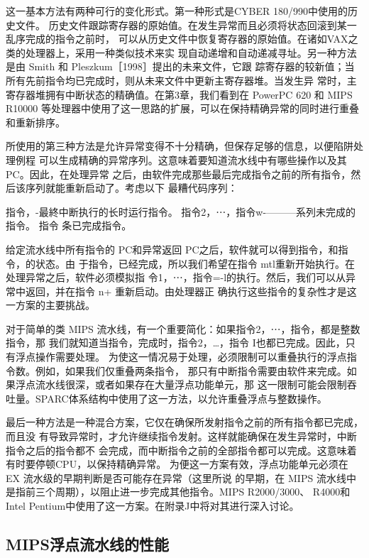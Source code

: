 这一基本方法有两种可行的变化形式。第一种形式是CYBER 180/990中使用的历史文件。
历史文件跟踪寄存器的原始值。在发生异常而且必须将状态回滚到某一乱序完成的指令之前时，
可以从历史文件中恢复寄存器的原始值。在诸如VAX之类的处理器上，采用一种类似技术来实
现自动递增和自动递减寻址。另一种方法是由 Smith 和 Pleszkum［1998］提出的未来文件，它跟
踪寄存器的较新值；当所有先前指令均已完成时，则从未来文件中更新主寄存器堆。当发生异
常时，主寄存器堆拥有中断状态的精确值。在第3章，我们看到在 PowerPC 620 和 MIPS R10000
等处理器中使用了这一思路的扩展，可以在保持精确异常的同时进行重叠和重新排序。

所使用的第三种方法是允许异常变得不十分精确，但保存足够的信息，以便陷阱处理例程
可以生成精确的异常序列。这意味着要知道流水线中有哪些操作以及其PC。因此，在处理异常
之后，由软件完成那些最后完成指令之前的所有指令，然后该序列就能重新启动了。考虑以下
最糟代码序列：

指令，-最終中断执行的长时运行指令。
指令2，⋯，指令w-———系列未完成的指令。
指令 条已完成指令。

给定流水线中所有指令的 PC和异常返回 PC之后，软件就可以得到指令，和指令，的状态。由
于指令，已经完成，所以我们希望在指令 mtl重新开始执行。在处理异常之后，软件必须模拟指
令1，⋯，指令=-l的执行。然后，我们可以从异常中返回，并在指令 n+ 重新启动。由处理器正
确执行这些指令的复杂性才是这一方案的主要挑战。

对于简单的类 MIPS 流水线，有一个重要简化：如果指令2，⋯，指令，都是整数指令，那
我们就知道当指令，完成时，指令2，…，指令 I也都已完成。因此，只有浮点操作需要处理。
为使这一情况易于处理，必须限制可以重叠执行的浮点指令数。例如，如果我们仅重叠两条指令，
那只有中断指令需要由软件来完成。如果浮点流水线很深，或者如果存在大量浮点功能单元，那
这一限制可能会限制吞吐量。SPARC体系结构中使用了这一方法，以允许重叠浮点与整数操作。

最后一种方法是一种混合方案，它仅在确保所发射指令之前的所有指令都已完成，而且没
有导致异常时，才允许继续指令发射。这样就能确保在发生异常时，中断指令之后的指令都不
会完成，而中断指令之前的全部指令都可以完成。这意味着有时要停顿CPU，以保持精确异常。
为便这一方案有效，浮点功能单元必须在 EX 流水级的早期判断是否可能存在异常（这里所说
的早期，在 MIPS 流水线中是指前三个周期），以阻止进一步完成其他指令。MIPS R2000/3000、
R4000和 Intel Pentium中使用了这一方案。在附录J中将对其进行深入讨论。

\subsection{MIPS浮点流水线的性能}

